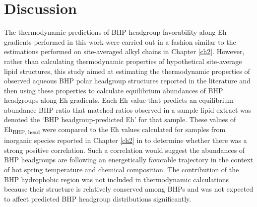 

\section{Discussion}

The thermodynamic predictions of BHP headgroup favorability along Eh gradients performed in this work were carried out in a fashion similar to the estimations performed on site-averaged alkyl chains in Chapter \ref{ch2}. However, rather than calculating thermodynamic properties of hypothetical site-average lipid structures, this study aimed at estimating the thermodynamic properties of observed aqueous BHP polar headgroup structures reported in the literature and then using these properties to calculate equilibrium abundances of BHP headgroups along Eh gradients. Each Eh value that predicts an equilibrium-abundance BHP ratio that matched ratios observed in a sample lipid extract was denoted the `BHP headgroup-predicted Eh' for that sample. These values of Eh\textsubscript{BHP, head} were compared to the Eh values calculated for samples from inorganic species reported in Chapter \ref{ch2} in to determine whether there was a strong positive correlation. Such a correlation would suggest the abundances of BHP headgroups are following an energetically favorable trajectory in the context of hot spring temperature and chemical composition. The contribution of the BHP hydrophobic region was not included in thermodynamic calculations because their structure is relatively conserved among BHPs and was not expected to affect predicted BHP headgroup distributions significantly.

